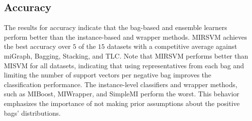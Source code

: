 \documentclass[reqno]{vcuthesis}
\numberwithin{equation}{chapter}
\begin{document}
\subsection{Accuracy}
The results for accuracy indicate that the bag-based and ensemble learners perform better than the instance-based and wrapper methods. MIRSVM achieves the best accuracy over $5$ of the $15$ datasets with a competitive average against miGraph, Bagging, Stacking, and TLC. Note that MIRSVM performs better than MISVM for all datasets, indicating that using representatives from each bag and limiting the number of support vectors per negative bag improves the classification performance. The instance-level classifiers and wrapper methods, such as MIBoost, MIWrapper, and SimpleMI perform the worst. This behavior emphasizes the importance of not making prior assumptions about the positive bags' distributions. 
\end{document}
